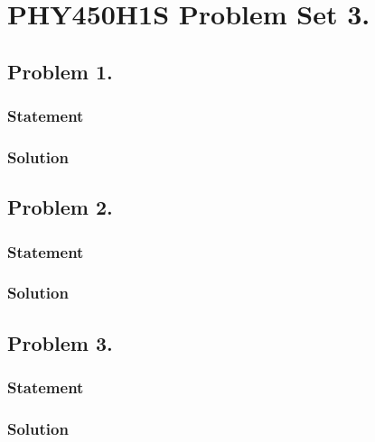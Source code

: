 %


\author{Peeter Joot}

\chapter{PHY450H1S Problem Set 3.}
\label{chap:relElectroDynProblemSet3}
\date{Feb 15, 2011}

\beginArtNoToc
%

\section{Problem 1.}
\subsection{Statement}
\subsection{Solution}

\section{Problem 2.}
\subsection{Statement}
\subsection{Solution}

\section{Problem 3.}
\subsection{Statement}
\subsection{Solution}

\EndNoBibArticle
